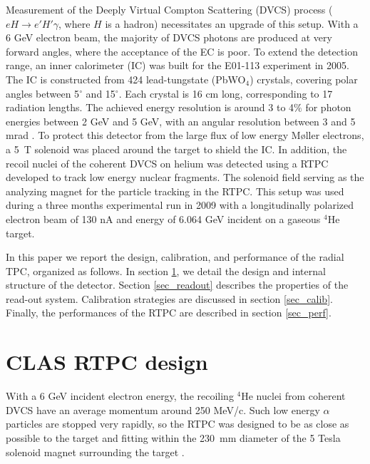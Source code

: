 \documentclass[twocolumn,showpacs,superscriptaddress,groupedaddress]{revtex4}
\begin{document}
Measurement of the Deeply Virtual Compton Scattering (DVCS) process
($eH \rightarrow e' H' \gamma$, where $H$ is a hadron) necessitates an upgrade
of this setup.  With a 6 GeV electron beam, the majority of DVCS photons are produced
at very forward angles, where the acceptance of the EC is poor. To extend the detection range,
an inner calorimeter (IC) was built for the E01-113 experiment in 2005.
The IC is constructed from 424 lead-tungstate (PbWO$_{4}$) crystals, covering polar 
angles between 5$^{\circ}$ and 15$^{\circ}$. Each crystal is 16 cm long, corresponding
to 17 radiation lengths. The achieved energy resolution is around 3 to 4$\%$ for photon
energies between 2 GeV and 5 GeV, with an angular resolution between 3 and 5 mrad 
\cite{Hyon-suk}. To protect this detector from the large flux of low energy M{\o}ller 
electrons, a 5~T solenoid was placed around the target to shield the IC. 
In addition, the recoil nuclei of the coherent DVCS on helium was detected 
using a RTPC developed to track low energy nuclear fragments. The solenoid field
serving as the analyzing magnet for the particle tracking in the RTPC. This 
setup was used during a three months experimental run
in 2009 with a longitudinally polarized electron beam of 130 nA 
and energy of 6.064 GeV incident on a gaseous $^{4}$He target.

In this paper we report the design, calibration, and performance of the radial 
TPC, organized as follows. In section \ref{sec_design}, we detail the design 
and internal structure of the detector. Section \ref{sec_readout} describes 
the properties of the read-out system. Calibration 
strategies are discussed in section \ref{sec_calib}. Finally, the performances
of the RTPC are described in section \ref{sec_perf}.

\section{CLAS RTPC design} \label{sec_design}

With a 6 GeV incident electron energy, the recoiling $^{4}$He nuclei from coherent 
DVCS have an average momentum around 250 MeV/c. Such low energy $\alpha$ 
particles are stopped very rapidly, so the RTPC was designed to be as close 
as possible to the target and fitting within the 230~mm diameter 
of the 5 Tesla solenoid magnet surrounding the target \cite{Hyon-suk}. 
\end{document}
